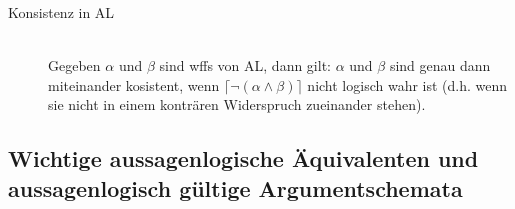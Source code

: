 \documentclass{scrartcl}
\begin{document}
\begin{description}
	\item[Konsistenz in AL] \mbox{}\\ Gegeben $ \alpha $ und $ \beta $ sind wffs von AL, dann gilt: $ \alpha $ und $ \beta $ sind genau dann miteinander kosistent, wenn $ \lceil \neg (\alpha \wedge \beta) \rceil $ nicht logisch wahr ist (d.h. wenn sie nicht in einem konträren Widerspruch zueinander stehen).
\end{description}

\subsection{Wichtige aussagenlogische Äquivalenten und aussagenlogisch gültige Argumentschemata}

\renewcommand{\arraystretch}{1.5}
\end{document}
